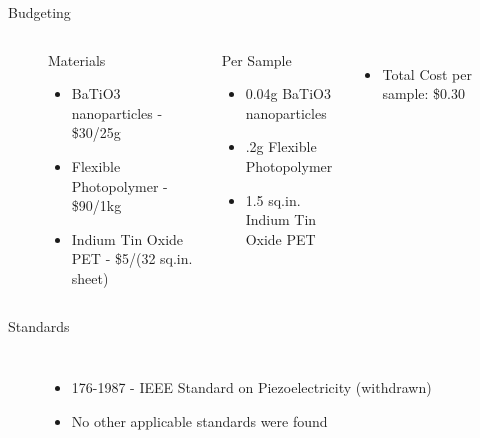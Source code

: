 \documentclass[hyperref=pdftex, presentation]{beamer}
\begin{document}
\begin{frame}{\Large Budgeting}
	\begin{figure}
		\begin{columns}[c] %
			
			\begin{block}{Materials}
				\begin{itemize}
 					\item<2-> BaTiO3 nanoparticles - \$30/25g%
 					\item<3-> Flexible Photopolymer - \$90/1kg
 					\item<4-> Indium Tin Oxide PET - \$5/(32 sq.in. sheet)
				\end{itemize}
			\end{block}
			\begin{block}{Per Sample}
				\begin{itemize}
 					\item<2-> 0.04g BaTiO3 nanoparticles
 					\item<3-> .2g Flexible Photopolymer
 					\item<4-> 1.5 sq.in. Indium Tin Oxide PET
				\end{itemize}
			\end{block}
			\begin{itemize}
				\item<5-> Total Cost per sample: \$0.30
			\end{itemize}
			
		\end{columns}
	\end{figure}
\end{frame}


\begin{frame}{\Large Standards}
	\begin{figure}
		\begin{columns}[c] %
			
			\begin{itemize}
				\item 176-1987 - IEEE Standard on Piezoelectricity (withdrawn)
				\item No other applicable standards were found
			\end{itemize}
			
		\end{columns}
	\end{figure}
\end{frame}
\end{document}
